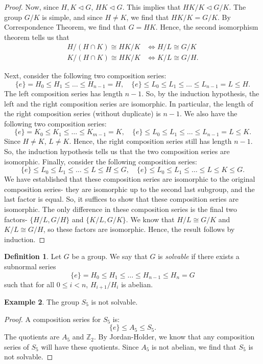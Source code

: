 \documentclass[a4paper, openany]{memoir}
\theoremstyle{definition}
\newtheorem{definition}{Definition}[section]
\newtheorem{example}[definition]{Example}
\theoremstyle{plain}
\begin{document}
\begin{proof}
        Now, since $H, K \vartriangleleft G$, $HK \vartriangleleft G$. This implies that $HK/K \vartriangleleft G/K$. The group $G/K$ is simple, and since $H \neq K$, we find that $HK/K = G/K$. By Correspondence Theorem, we find that $G = HK$. Hence, the second isomorphism theorem tells us that
        \begin{align*}
            H/(H \cap K) \cong HK/K &\iff H/L \cong G/K \\
            K/(H \cap K) \cong HK/K &\iff K/L \cong G/H.
        \end{align*}
        
        Next, consider the following two composition series:
        \[\{e\} = H_0 \leq H_1 \leq \dots \leq H_{n-1} = H, \quad \{e\} \leq L_0 \leq L_1 \leq \dots \leq L_{n-1} = L \leq H.\]
        The left composition series has length $n-1$. So, by the induction hypothesis, the left and the right composition series are isomorphic. In particular, the length of the right composition series (without duplicate) is $n-1$. We also have the following two composition series:
        \[\{e\} = K_0 \leq K_1 \leq \dots \leq K_{m-1} = K, \quad \{e\} \leq L_0 \leq L_1 \leq \dots \leq L_{n-1} = L \leq K.\]
        Since $H \neq K$, $L \neq K$. Hence, the right composition series still has length $n-1$. So, the induction hypothesis tells us that the two composition series are isomorphic. Finally, consider the following composition series:
        \[\{e\} \leq L_0 \leq L_1 \leq \dots \leq L \leq H \leq G, \quad \{e\} \leq L_0 \leq L_1 \leq \dots \leq L \leq K \leq G.\]
        We have established that these composition series are isomorphic to the original composition series- they are isomorphic up to the second last subgroup, and the last factor is equal. So, it suffices to show that these composition series are isomorphic. The only difference in these composition series is the final two factors- $\{H/L, G/H\}$ and $\{K/L, G/K\}$. We know that $H/L \cong G/K$ and $K/L \cong G/H$, so these factors are isomorphic. Hence, the result follows by induction.
    \end{proof}

    \begin{definition}
        Let $G$ be a group. We say that $G$ is \emph{solvable} if there exists a subnormal series
        \[\{e\} = H_0 \leq H_1 \leq \dots \leq H_{n-1} \leq H_n = G\]
        such that for all $0 \leq i < n$, $H_{i+1}/H_i$ is abelian.
    \end{definition}

    \begin{example}
        The group $S_5$ is not solvable.
    \end{example}
    \begin{proof}
        A composition series for $S_5$ is:
        \[\{e\} \leq A_5 \leq S_5.\]
        The quotients are $A_5$ and $\mathbb{Z}_2$. By Jordan-Holder, we know that any composition series of $S_5$ will have these quotients. Since $A_5$ is not abelian, we find that $S_5$ is not solvable.
    \end{proof}
\end{document}
